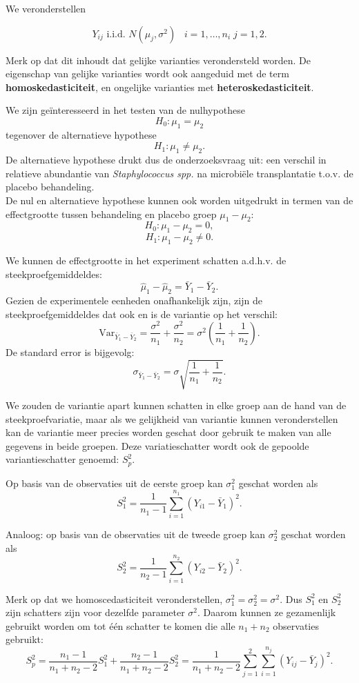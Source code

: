 \documentclass[12pt,dutch,coursenotes]{book}
\theoremstyle{definition}
\theoremstyle{definition}
\theoremstyle{definition}
\theoremstyle{remark}
\begin{document}
We veronderstellen

\[Y_{ij}\text{ i.i.d. } N(\mu_j,\sigma^2)\;\;\;i=1,\ldots,n_i\;j=1,2.\]

Merk op dat dit inhoudt dat gelijke varianties verondersteld worden. De
eigenschap van gelijke varianties wordt ook aangeduid met de term
\textbf{homoskedasticiteit}, en ongelijke varianties met
\textbf{heteroskedasticiteit}.

We zijn geïnteresseerd in het testen van de nulhypothese
\[ H_0: \mu_1 = \mu_2 \] tegenover de alternatieve hypothese
\[  H_1: \mu_1 \neq \mu_2 .\] De alternatieve hypothese drukt dus de
onderzoeksvraag uit: een verschil in relatieve abundantie van
\emph{Staphylococcus spp.} na microbiële transplantatie t.o.v. de
placebo behandeling.\\
De nul en alternatieve hypothese kunnen ook worden uitgedrukt in termen
van de effectgrootte tussen behandeling en placebo groep
\(\mu_1-\mu_2\): \[H_0: \mu_1-\mu_2 = 0,\] \[H_1: \mu_1-\mu_2 \neq 0.\]

We kunnen de effectgrootte in het experiment schatten a.d.h.v. de
steekproefgemiddeldes: \[\hat \mu_1-\hat \mu_2=\bar Y_1 -\bar Y_2.\]
Gezien de experimentele eenheden onafhankelijk zijn, zijn de
steekproefgemiddeldes dat ook en is de variantie op het verschil:
\[\text{Var}_{\bar Y_1 -\bar Y_2}=\frac{\sigma^2}{n_1}+\frac{\sigma^2}{n_2}=\sigma^2 \left(\frac{1}{n_1}+\frac{1}{n_2}\right).\]
De standard error is bijgevolg:
\[\sigma_{\bar Y_1 -\bar Y_2}=\sigma\sqrt{\frac{1}{n_1}+\frac{1}{n_2}}.\]

We zouden de variantie apart kunnen schatten in elke groep aan de hand
van de steekproefvariatie, maar als we gelijkheid van variantie kunnen
veronderstellen kan de variantie meer precies worden geschat door
gebruik te maken van alle gegevens in beide groepen. Deze
variatieschatter wordt ook de gepoolde variantieschatter genoemd:
\(S^2_p\).

Op basis van de observaties uit de eerste groep kan \(\sigma^2_1\)
geschat worden als
\[S_1^2 = \frac{1}{n_1-1}\sum_{i=1}^{n_1} (Y_{i1}-\bar{Y}_1)^2.\]

Analoog: op basis van de observaties uit de tweede groep kan
\(\sigma^2_2\) geschat worden als
\[S_2^2 = \frac{1}{n_2-1}\sum_{i=1}^{n_2} (Y_{i2}-\bar{Y}_2)^2.\]

Merk op dat we homoscedasticiteit veronderstellen,
\(\sigma_1^2=\sigma_2^2=\sigma^2\). Dus \(S_1^2\) en \(S_2^2\) zijn
schatters zijn voor dezelfde parameter \(\sigma^2\). Daarom kunnen ze
gezamenlijk gebruikt worden om tot één schatter te komen die alle
\(n_1+n_2\) observaties gebruikt:
\[  S_p^2 = \frac{n_1-1}{n_1+n_2-2} S_1^2 + \frac{n_2-1}{n_1+n_2-2} S_2^2 = \frac{1}{n_1+n_2-2}\sum_{j=1}^2\sum_{i=1}^{n_j} (Y_{ij} - \bar{Y}_j)^2.\]
\end{document}
